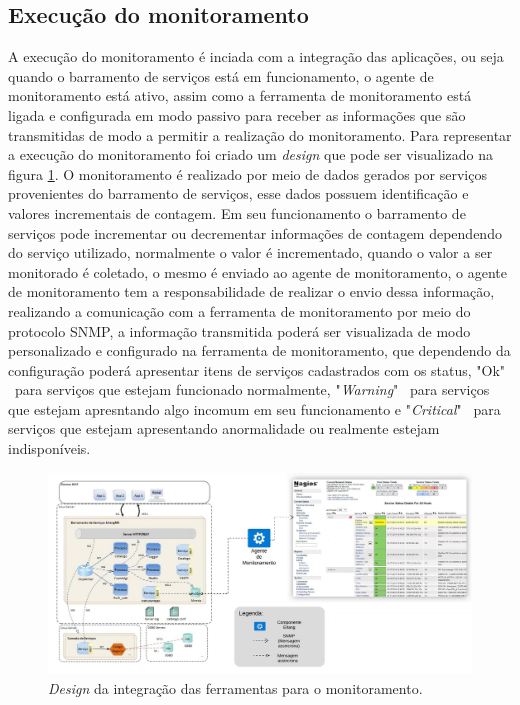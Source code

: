 \subsection{Execução do monitoramento}

A execução do monitoramento é inciada com a integração das aplicações, ou seja quando o barramento de serviços está em funcionamento, o agente de monitoramento está ativo, assim como a ferramenta de monitoramento está ligada e configurada em modo passivo para receber as informações que são transmitidas de modo a permitir a realização do monitoramento. Para representar a execução do monitoramento foi criado um \textit{design} que pode ser visualizado na figura \ref{fun:fig:arqtProjeto}. O monitoramento é realizado por meio de dados gerados por serviços provenientes do barramento de serviços, esse dados possuem identificação e valores incrementais de contagem. Em seu funcionamento o barramento de serviços pode incrementar ou decrementar informações de contagem dependendo do serviço utilizado, normalmente o valor é incrementado, quando o valor a ser monitorado é coletado, o mesmo é enviado ao agente de monitoramento, o agente de monitoramento tem a responsabilidade de realizar o envio dessa informação, realizando a comunicação com a ferramenta de monitoramento por meio do protocolo \acrshort{SNMP}, a informação transmitida poderá ser visualizada de modo personalizado e configurado na ferramenta de monitoramento, que dependendo da configuração poderá apresentar itens de serviços cadastrados com os status, "Ok" \ para serviços que estejam funcionado normalmente, "\textit{Warning}" \  para serviços que estejam apresntando algo incomum em seu funcionamento e "\textit{Critical}" \ para serviços que estejam apresentando anormalidade ou realmente estejam indisponíveis.	 

\begin{figure}[h!]
	\begin{center}
	\includegraphics[scale = 0.45]{img/arqtProjeto.jpeg}
	\caption{\textit{Design} da integração das ferramentas para o monitoramento.}
	\label{fun:fig:arqtProjeto}
	\end{center}
\end{figure}



